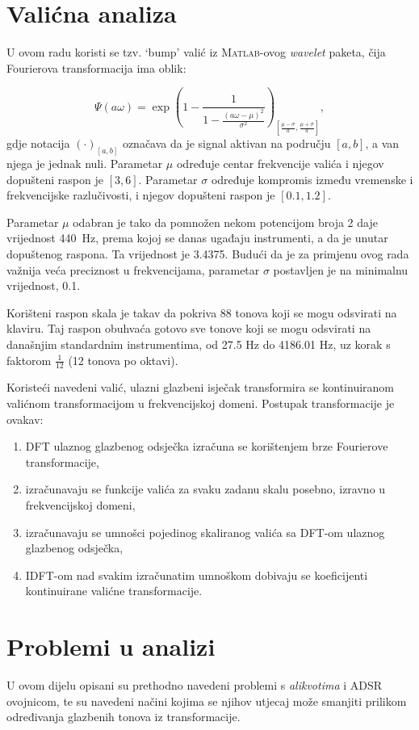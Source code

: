 \documentclass[a4paper, 10pt, twocolumn]{article}
\begin{document}
\section{Valićna analiza}
U ovom radu koristi se tzv. `bump' valić iz \textsc{Matlab}-ovog \textit{wavelet} paketa, čija Fourierova transformacija ima oblik\cite{matlab}:

$$ \Psi\left( a \omega \right) = \exp\left( 1 - \frac{1}{1 - \frac{\left(a \omega - \mu \right)^2}{\sigma^2}} \right)_{\left[ \frac{\mu - \sigma}{a}, \frac{\mu + \sigma}{a} \right]}, $$
gdje notacija $(\cdot)_{[a, b]}$ označava da je signal aktivan na području $[a, b]$, a van njega je jednak nuli.
Parametar $\mu$ određuje centar frekvencije valića i njegov dopušteni raspon je $[3, 6]$.
Parametar $\sigma$ određuje kompromis između vremenske i frekvencijske razlučivosti, i njegov dopušteni raspon je $[0.1, 1.2]$.

Parametar $\mu$ odabran je tako da pomnožen nekom potencijom broja 2 daje vrijednost 440\ Hz, prema kojoj se danas ugađaju instrumenti, a da je unutar dopuštenog raspona. Ta vrijednost je 3.4375.
Budući da je za primjenu ovog rada važnija veća preciznost u frekvencijama, parametar $\sigma$ postavljen je na minimalnu vrijednost, 0.1.

Korišteni raspon skala je takav da pokriva 88 tonova koji se mogu odsvirati na klaviru.
Taj raspon obuhvaća gotovo sve tonove koji se mogu odsvirati na današnjim standardnim instrumentima, od 27.5 Hz do 4186.01 Hz, uz korak s faktorom ${\frac{1}{12}}$ (12 tonova po oktavi).

Koristeći navedeni valić, ulazni glazbeni isječak transformira se kontinuiranom valićnom transformacijom u frekvencijskoj domeni.
Postupak transformacije je ovakav:
\begin{enumerate}
  \item DFT ulaznog glazbenog odsječka izračuna se korištenjem brze Fourierove transformacije,
  \item izračunavaju se funkcije valića za svaku zadanu skalu posebno, izravno u frekvencijskoj domeni,
  \item izračunavaju se umnošci pojedinog skaliranog valića sa DFT-om ulaznog glazbenog odsječka,
  \item IDFT-om nad svakim izračunatim umnoškom dobivaju se koeficijenti kontinuirane valićne transformacije.
\end{enumerate}

\section{Problemi u analizi}
U ovom dijelu opisani su prethodno navedeni problemi s \textit{alikvotima} i ADSR ovojnicom, te su navedeni načini kojima se njihov utjecaj može smanjiti prilikom određivanja glazbenih tonova iz transformacije.
\end{document}
